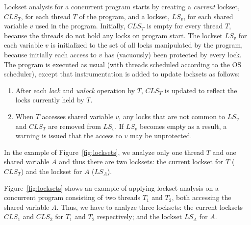
Lockset analysis for a concurrent program starts by creating a \emph{current} lockset, $\mathit{CLS}_T$, for each thread $T$ of the program, and a lockset, $\mathit{LS}_v$, for each shared variable $v$ used in the program. Initially, $\mathit{CLS}_T$ is empty for every thread $T$, because the threads do not hold any locks on program start. The lockset $\mathit{LS}_v$ for each variable $v$ is initialized to the set of all locks manipulated by the program, because initially each access to $v$ has (vacuously) been protected by every lock. The program is executed as usual (with threads scheduled according to the OS scheduler), except that instrumentation is added to update locksets as follows:
%
\begin{enumerate}
\item After each \emph{lock} and \emph{unlock} operation by $T$, $\mathit{CLS}_T$ is updated to reflect the locks currently held by $T$.
\item When $T$ accesses shared variable $v$, any locks that are not common to $\mathit{LS}_v$ and $\mathit{CLS}_T$ are removed from $\mathit{LS}_v$.
If $\mathit{LS}_v$ becomes empty as a result, a warning is issued that the access to $v$ may be unprotected.
\end{enumerate}

In the example of Figure~\ref{fig:locksets}, we analyze only one thread $T$ and one shared variable $A$ and thus there are two locksets: the current lockset for $T$ ($\mathit{CLS}_T$) and the lockset for $A$ ($\mathit{LS}_A$).

Figure~\ref{fig:locksets} shows an example of applying lockset analysis on a concurrent program consisting of two threads $T_1$ and $T_2$, both accessing the shared variable $A$. Thus, we have to analyze three locksets: the current locksets $\mathit{CLS}_1$ and $\mathit{CLS}_2$ for $T_1$ and $T_2$ respectively; and the lockset $\mathit{LS}_A$ for $A$.


